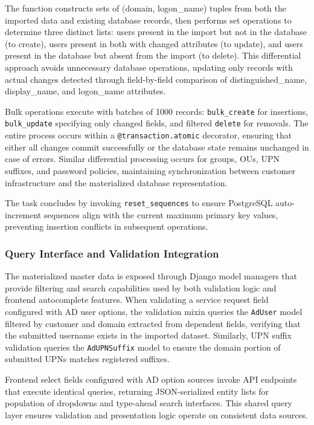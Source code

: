 The function constructs sets of (domain, logon\_name) tuples from both the imported data and existing database records, then performs set operations to determine three distinct lists: users present in the import but not in the database (to create), users present in both with changed attributes (to update), and users present in the database but absent from the import (to delete). This differential approach avoids unnecessary database operations, updating only records with actual changes detected through field-by-field comparison of distinguished\_name, display\_name, and logon\_name attributes.

Bulk operations execute with batches of 1000 records: \texttt{bulk\_create} for insertions, \texttt{bulk\_update} specifying only changed fields, and filtered \texttt{delete} for removals. The entire process occurs within a \texttt{@transaction.atomic} decorator, ensuring that either all changes commit successfully or the database state remains unchanged in case of errors. Similar differential processing occurs for groups, OUs, UPN suffixes, and password policies, maintaining synchronization between customer infrastructure and the materialized database representation.

The task concludes by invoking \texttt{reset\_sequences} to ensure PostgreSQL auto-increment sequences align with the current maximum primary key values, preventing insertion conflicts in subsequent operations.

\subsubsection{Query Interface and Validation Integration}

The materialized master data is exposed through Django model managers that provide filtering and search capabilities used by both validation logic and frontend autocomplete features. When validating a service request field configured with AD user options, the validation mixin queries the \texttt{AdUser} model filtered by customer and domain extracted from dependent fields, verifying that the submitted username exists in the imported dataset. Similarly, UPN suffix validation queries the \texttt{AdUPNSuffix} model to ensure the domain portion of submitted UPNs matches registered suffixes.

Frontend select fields configured with AD option sources invoke API endpoints that execute identical queries, returning JSON-serialized entity lists for population of dropdowns and type-ahead search interfaces. This shared query layer ensures validation and presentation logic operate on consistent data sources.

